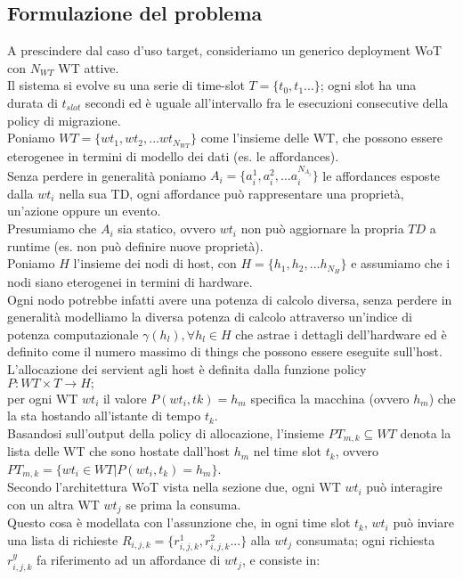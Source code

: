 \documentclass[11pt]{article}
\begin{document}
		\subsection{Formulazione del problema}
		A prescindere dal caso d'uso target, consideriamo un generico deployment WoT con $N_{WT}$ WT attive. \\
		Il sistema si evolve su una serie di time-slot $T = \{t_0, t_1...\}$; ogni slot ha una durata di $t_{slot}$ secondi ed è uguale all'intervallo fra le esecuzioni consecutive della policy di migrazione. \\
		Poniamo $WT = \{ wt_1, wt_2, ... wt_{N_{WT}} \}$ come l'insieme delle WT, che possono essere eterogenee in termini di modello dei dati (es. le affordances). \\
		Senza perdere in generalità poniamo $A_i = \{a_i^1, a_i^2, ... a_i^{N_{A_i}}\}$ le affordances esposte dalla $wt_i$ nella sua TD, ogni affordance può rappresentare una proprietà, un'azione oppure un evento. \\
		Presumiamo che $A_i$ sia statico, ovvero $wt_i$ non può aggiornare la propria $TD$ a runtime (es. non può definire nuove proprietà).\\
		Poniamo $H$ l'insieme dei nodi di host, con $H = \{h_1, h_2, ... h_{N_H}\}$ e assumiamo che i nodi siano eterogenei in termini di hardware. \\
		Ogni nodo potrebbe infatti avere una potenza di calcolo diversa, senza perdere in generalità modelliamo la diversa potenza di calcolo attraverso un'indice di potenza computazionale $\gamma(h_l), \forall h_l \in H$ che astrae i dettagli dell'hardware ed è definito come il numero massimo di things che possono essere eseguite sull'host. \\
		L'allocazione dei servient agli host è definita dalla funzione policy $P : WT \times T \rightarrow H;$ \\
		per ogni WT $wt_i$ il valore $P(wt_i, tk) = h_m$ specifica la macchina (ovvero $h_m$) che la sta hostando all'istante di tempo $t_k$. \\
		Basandosi sull'output della policy di allocazione, l'insieme $PT_{m,k} \subseteq WT$ denota la lista delle WT che sono hostate dall'host $h_m$ nel time slot $t_k$, ovvero $PT_{m,k} = \{ wt_i \in WT | P(wt_i, t_k) = h_m \}$. \\
		Secondo l'architettura WoT vista nella sezione due, ogni WT $wt_i$ può interagire con un altra WT $wt_j$ se prima la consuma. \\
		Questo cosa è modellata con l'assunzione che, in ogni time slot $t_k$, $wt_i$ può inviare una lista di richieste $R_{i,j,k} = \{ r^1_{i,j,k}, r^2_{i,j,k} ...  \}$ alla $wt_j$ consumata; ogni richiesta $r^y_{i,j,k}$ fa riferimento ad un affordance di $wt_j$, e consiste in:
\end{document}
